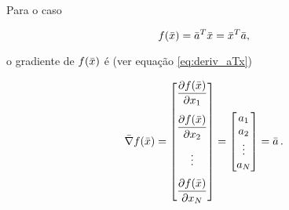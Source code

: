 \begin{example}
    Para o caso

    \begin{equation}
    f(\bar{x}) = \bar{a}^T\bar{x} = \bar{x}^T\bar{a},
    \end{equation}
    
    \noindent o gradiente de $f(\bar{x})$ é (ver equação \ref{eq:deriv_aTx})
    
    \begin{equation}
    \vect{\nabla}f(\vect{x}) =
    \begin{bmatrix}
    \dfrac{\partial f(\vect{x})}{\partial x_1} \vspace{0.3cm}\\
    \dfrac{\partial f(\vect{x})}{\partial x_2} \vspace{0.3cm}\\
    \vdots \vspace{0.3cm}\\
    \dfrac{\partial f(\vect{x})}{\partial x_N}
    \end{bmatrix}
    =
    \begin{bmatrix}
    a_1 \\ a_2 \\ \vdots \\ a_N
    \end{bmatrix}
    = \vect{a}
    \thinspace .
    \end{equation}
\end{example}
